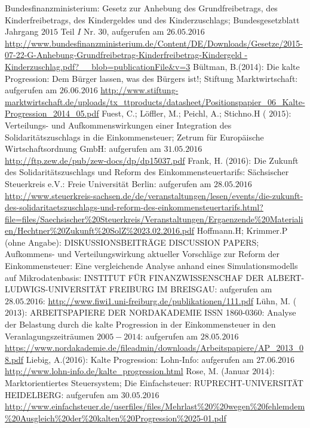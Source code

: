 
	\newpage
	\begin{thebibliography}{12345678}
	 Bundesfinanzministerium: Gesetz zur Anhebung des Grundfreibetrags, des Kinderfreibetrags, des Kindergeldes und des Kinderzuschlags; Bundesgesetzblatt Jahrgang $2015$ Teil $I$ Nr. $30$, aufgerufen am $26.05.2016$ \url{http://www.bundesfinanzministerium.de/Content/DE/Downloads/Gesetze/2015-07-22-G-Anhebung-Grundfreibetrag-Kinderfreibetrag-Kindergeld -Kinderzuschlag.pdf?__blob=publicationFile\&v=3}
	 Bültman, B.(2014): Die kalte Progression: Dem Bürger lassen, was des Bürgers ist!; Stiftung Marktwirtschaft: aufgerufen am $26.06.2016$ \url{http://www.stiftung-marktwirtschaft.de/uploads/tx_ttproducts/datasheet/Positionspapier_06_Kalte-Progression_2014_05.pdf}
	 Fuest, C.; Löffler, M.; Peichl, A.; Stichno.H ( $2015$): Verteilungs- und Aufkommenswirkungen einer Integration des Solidaritätszuschlags in die Einkommensteuer; Zetrum für Europäische Wirtschaftsordnung GmbH: aufgerufen am $31.05.2016$ \url{http://ftp.zew.de/pub/zew-docs/dp/dp15037.pdf}	
	Frank, H. ($2016$): Die Zukunft des Solidaritätszuschlags und Reform des Einkommensteuertarifs: Sächsischer Steuerkreis e.V.: Freie Universität Berlin: aufgerufen am $28.05.2016$ \url{http://www.steuerkreis-sachsen.de/de/veranstaltungen/lesen/events/die-zukunft-des-solidaritaetszuschlags-und-reform-des-einkommensteuertarifs.html?file=files/Saechsischer%20Steuerkreis/Veranstaltungen/Ergaenzende%20Materialien/Hechtner%20Zukunft%20SolZ%2023.02.2016.pdf}
	 Hoffmann.H; Krimmer.P (ohne Angabe): DISKUSSIONSBEITRÄGE DISCUSSION PAPERS; Aufkommens- und Verteilungswirkung aktueller Vorschläge zur Reform der Einkommensteuer: Eine vergleichende Analyse anhand eines Simulationsmodells auf Mikrodatenbasis: INSTITUT FÜR FINANZWISSENSCHAF DER ALBERT-LUDWIGS-UNIVERSITÄT FREIBURG IM BREISGAU: aufgerufen am $28.05.2016$: \url{http://www.fiwi1.uni-freiburg.de/publikationen/111.pdf}
	 Lühn, M. ($2013$): ARBEITSPAPIERE DER NORDAKADEMIE ISSN 1860-0360: Analyse der Belastung durch die kalte Progression in der Einkommensteuer in den Veranlagungszeiträumen $2005-2014$: aufgerufen am $28.05.2016$ %
\url{https://www.nordakademie.de/fileadmin/downloads/Arbeitspapiere/AP_2013_08.pdf}
	 Liebig, A.(2016): Kalte Progression: Lohn-Info: aufgerufen am $27.06.2016$ \url{http://www.lohn-info.de/kalte_progression.html}
	 Rose, M. (Januar $2014$): Marktorientiertes Steuersystem; Die Einfachsteuer: RUPRECHT-UNIVERSITÄT HEIDELBERG: aufgerufen am $30.05.2016$ \url{http://www.einfachsteuer.de/userfiles/files/Mehrlast%20%20wegen%20fehlemdem%20Ausgleich%20der%20kalten%20Progression%2025-01.pdf}

\end{thebibliography}
